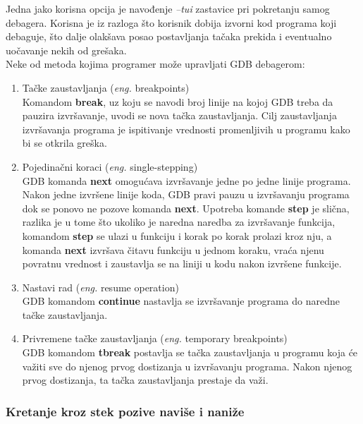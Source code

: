 \documentclass[a4paper]{article}
\begin{document}
Jedna jako korisna opcija je navođenje \textit{--tui} zastavice pri pokretanju samog debagera. 
Korisna je iz razloga što korisnik dobija izvorni kod programa koji debaguje, što dalje olakšava posao postavljanja
tačaka prekida i eventualno uočavanje nekih od grešaka\cite{oReilly}.\\
Neke od metoda kojima programer može upravljati GDB debagerom:\cite{art_debugging}
\begin{enumerate}
\item Tačke zaustavljanja (\textit{eng.} breakpoints) \\
Komandom \textbf{break}, uz koju se navodi broj linije na kojoj GDB treba da pauzira izvršavanje, 
uvodi se nova tačka zaustavljanja. Cilj zaustavljanja izvršavanja programa je ispitivanje vrednosti
promenljivih u programu kako bi se otkrila greška.
\item Pojedinačni koraci (\textit{eng.} single-stepping)\\
GDB komanda \textbf{next} omogućava izvršavanje jedne po jedne linije programa. 
Nakon jedne izvršene linije koda, GDB pravi pauzu u izvršavanju programa dok se ponovo ne 
pozove komanda \textbf{next}. Upotreba komande \textbf{step} je slična, razlika je u tome što
ukoliko je naredna naredba za izvršavanje funkcija, 
komandom \textbf{step} se ulazi u funkciju i korak po korak prolazi kroz nju, a 
komanda \textbf{next} izvršava čitavu funkciju u jednom koraku, vraća njenu povratnu 
vrednost i zaustavlja se na liniji u kodu nakon izvršene funkcije.
\item Nastavi rad (\textit{eng.} resume operation)\\
GDB komandom \textbf{continue} nastavlja se izvršavanje programa do naredne tačke zaustavljanja. 
\item Privremene tačke zaustavljanja (\textit{eng.} temporary breakpoints)\\
GDB komandom \textbf{tbreak} postavlja se tačka zaustavljanja u programu koja će važiti 
sve do njenog prvog dostizanja u izvršavanju programa. Nakon njenog prvog dostizanja, 
ta tačka zaustavljanja prestaje da važi. 
\end{enumerate}

\subsubsection{Kretanje kroz stek pozive naviše i naniže}
\label{subsec:debager_stek}
\end{document}

